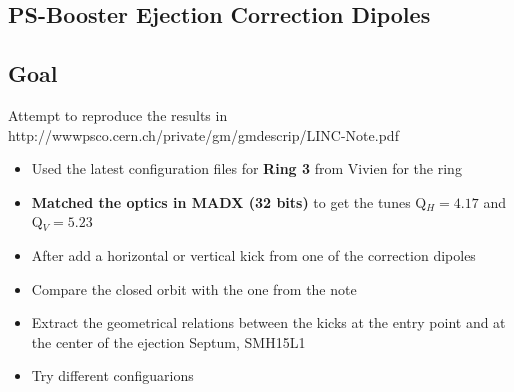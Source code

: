 \documentclass[11pt,letter,english]{article}
\begin{document}
\nocite{*} 

\small
\newcommand*{\data}{\ifcase\month\or
  January\or February\or March\or April\or May\or June\or
  July\or August\or September\or October\or November\or December\fi
  \space\number\day th,\space\number\year}
\newcommand{\blue}    {\color[named]{Blue}}
\newcommand{\black}   {\color[named]{Black}}
\newcommand{\red}     {\color[named]{Red}}
\newcommand{\green}   {\color[named]{Green}}
\newcommand{\orange}  {\color[named]{Orange}}
\newcommand{\yellow}  {\color[named]{Yellow}}
\newcommand{\magenta} {\color[named]{Magenta}}
\newcommand{\cyan}    {\color[named]{Cyan}}

\def\CP{{\sffamily CP}}

\begin{center}
 \section*{\huge{PS-Booster Ejection Correction Dipoles}} 
 \vspace {0.6cm}
\end{center}

\subsection*{Goal}

Attempt to reproduce the results in http://wwwpsco.cern.ch/private/gm/gmdescrip/LINC-Note.pdf

\begin{itemize}
\item{Used the latest configuration files for {\bf Ring 3} from Vivien for the ring}
\item{{\bf Matched the optics in MADX (32 bits)} to get the tunes Q$_H=4.17$ and Q$_V=5.23$}
\item{After add a horizontal or vertical kick from one of the correction dipoles}
\item{Compare the closed orbit with the one from the note}
\item{Extract the geometrical relations between the kicks at the entry point and at the center of the ejection Septum, SMH15L1}
\item{Try different configuarions}
\end{itemize}
\end{document}

